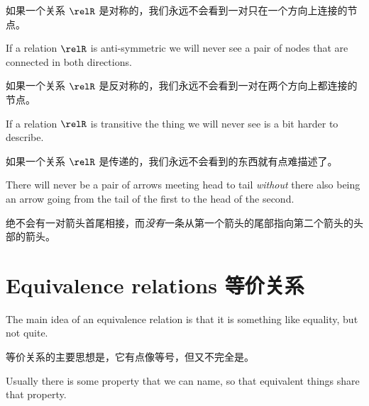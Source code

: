 如果一个关系 $\relR$ 是对称的，我们永远不会看到一对只在一个方向上连接的节点。

\begin{center}

\end{center}

\vfill

\newpage

If a relation $\relR$ is anti-symmetric we will never see a pair of nodes that are connected in both
directions.

如果一个关系 $\relR$ 是反对称的，我们永远不会看到一对在两个方向上都连接的节点。

\begin{center}

\end{center}

\vfill

If a relation $\relR$ is transitive the thing we will never see is a bit harder to describe.

如果一个关系 $\relR$ 是传递的，我们永远不会看到的东西就有点难描述了。

There will never be a pair of arrows meeting head to tail \emph{without} there also being an
arrow going from the tail of the first to the head of the second.

绝不会有一对箭头首尾相接，而\emph{没有}一条从第一个箭头的尾部指向第二个箭头的头部的箭头。

\begin{center}

\end{center}

\vfill

\newpage





\newpage

\section{Equivalence relations 等价关系}
\label{sec:eq_rel}

The main idea of an equivalence relation is that it is something like
equality, but not quite.

等价关系的主要思想是，它有点像等号，但又不完全是。

Usually there is some property that 
we can name, so that equivalent things share that property.

